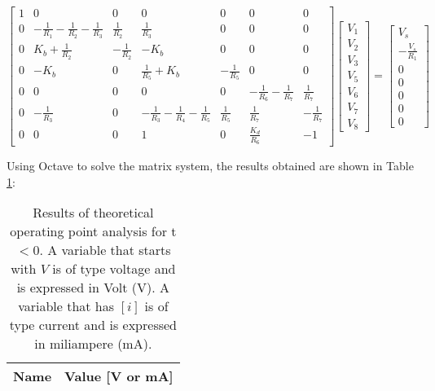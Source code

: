 \begin{equation}
\begin{bmatrix}
1 & 0& 0& 0& 0& 0& 0 \\ 
0 & -\frac{1}{R_{1}}-\frac{1}{R_{2}}-\frac{1}{R_{3}} & \frac{1}{R_{2}} & \frac{1}{R_{3}} & 0&  0& 0\\ 
0 & K_{b}+\frac{1}{R_{2}} & -\frac{1}{R_{2}} & -K_{b} & 0 &  0& 0\\ 
0 & -K_{b} & 0 & \frac{1}{R_{5}}+K_{b} & -\frac{1}{R_{5}} & 0 &0 \\ 
0 & 0 &0  & 0 &0  & -\frac{1}{R_{6}}-\frac{1}{R_{7}} & \frac{1}{R_{7}} \\
0 & -\frac{1}{R_{3}} &0  & -\frac{1}{R_{3}}-\frac{1}{R_{4}}-\frac{1}{R_{5}} & \frac{1}{R_{5}} & \frac{1}{R_{7}} & -\frac{1}{R_{7}}\\ 
0 & 0 & 0 & 1 & 0 & \frac{K_{d}}{R_{6}} & -1
\end{bmatrix}
\begin{bmatrix}
V_{1}\\ 
V_{2}\\ 
V_{3}\\ 
V_{5}\\ 
V_{6}\\ 
V_{7}\\ 
V_{8}
\end{bmatrix}
=
\begin{bmatrix}
V_{s}\\ 
-\frac{V_{s}}{R_{1}}\\ 
0\\ 
0\\ 
0\\ 
0\\ 
0
\end{bmatrix}
\end{equation}

Using Octave to solve the matrix system, the results obtained are shown in Table \ref{tab:nodal1}:

\begin{table}[H]
  \centering
  \begin{tabular}{|l|r|}
    \hline    
    {\bf Name} & {\bf Value [V or mA]} \\ \hline
    
  \end{tabular}
  \caption{Results of theoretical operating point analysis for t$<$0. A variable that starts with $V$ is of type voltage and is expressed in Volt (V). A variable that has $[i]$ is of type current and is expressed in miliampere (mA).}
  \label{tab:nodal1}
\end{table}



